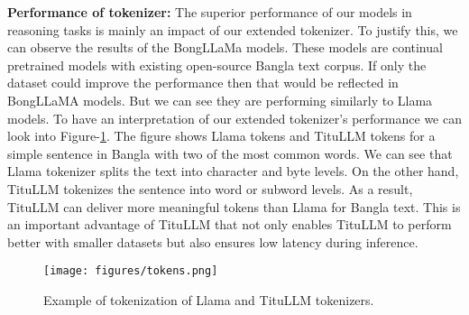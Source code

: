 \noindent \textbf{Performance of tokenizer: } The superior performance of our models in reasoning tasks is mainly an impact of our extended tokenizer. To justify this, we can observe the results of the BongLLaMa models. These models are continual pretrained models with existing open-source Bangla text corpus. If only the dataset could improve the performance then that would be reflected in BongLLaMA models. But we can see they are performing similarly to Llama models. To have an interpretation of our extended tokenizer's performance we can look into Figure-\ref{fig:tokens}. The figure shows Llama tokens and TituLLM tokens for a simple sentence in Bangla with two of the most common words. We can see that Llama tokenizer splits the text into character and byte levels. On the other hand, TituLLM tokenizes the sentence into word or subword levels. As a result, TituLLM can deliver more meaningful tokens than Llama for Bangla text. This is an important advantage of TituLLM that not only enables TituLLM to perform better with smaller datasets but also ensures low latency during inference.

\begin{figure}[t]
  \centering
\texttt{[image: figures/tokens.png]}
  \caption{Example of tokenization of Llama and TituLLM tokenizers.}
  \vspace{-0.2cm}
  \label{fig:tokens}
  \vspace{-0.2cm}
\end{figure}








